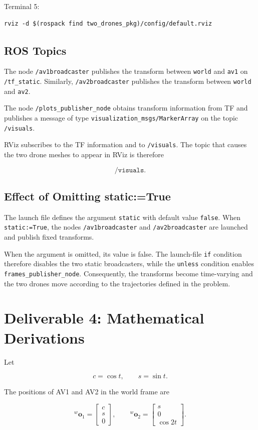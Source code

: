 \documentclass[11pt,a4paper]{article}
\begin{document}
Terminal 5:
\begin{verbatim}
rviz -d $(rospack find two_drones_pkg)/config/default.rviz
\end{verbatim}

\subsection{ROS Topics}

The node \texttt{/av1broadcaster} publishes the transform between
\texttt{world} and \texttt{av1} on \texttt{/tf\_static}. Similarly,
\texttt{/av2broadcaster} publishes the transform between
\texttt{world} and \texttt{av2}.

The node \texttt{/plots\_publisher\_node} obtains transform information
from TF and publishes a message of type
\texttt{visualization\_msgs/MarkerArray} on the topic
\texttt{/visuals}.

RViz subscribes to the TF information and to \texttt{/visuals}. The
topic that causes the two drone meshes to appear in RViz is therefore

\[
\boxed{\texttt{/visuals}}.
\]

\subsection{Effect of Omitting static:=True}

The launch file defines the argument \texttt{static} with default value
\texttt{false}. When \texttt{static:=True}, the nodes
\texttt{/av1broadcaster} and \texttt{/av2broadcaster} are launched and
publish fixed transforms.

When the argument is omitted, its value is false. The launch-file
\texttt{if} condition therefore disables the two static broadcasters,
while the \texttt{unless} condition enables
\texttt{frames\_publisher\_node}. Consequently, the transforms become
time-varying and the two drones move according to the trajectories
defined in the problem.

\section{Deliverable 4: Mathematical Derivations}

Let

\[
c = \cos t,
\qquad
s = \sin t.
\]

The positions of AV1 and AV2 in the world frame are

\[
{}^{w}\bm{o}_1 =
\begin{bmatrix}
c\\
s\\
0
\end{bmatrix},
\qquad
{}^{w}\bm{o}_2 =
\begin{bmatrix}
s\\
0\\
\cos 2t
\end{bmatrix}.
\]
\end{document}
